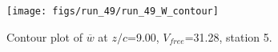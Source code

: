 \begin{figure}[H]
\centering
\texttt{[image: figs/run\_49/run\_49\_W\_contour]}
\caption{Contour plot of $\overline{w}$ at $z/c$=9.00, $V_{free}$=31.28, station 5.}
\label{fig:run_49_W_contour}
\end{figure}


